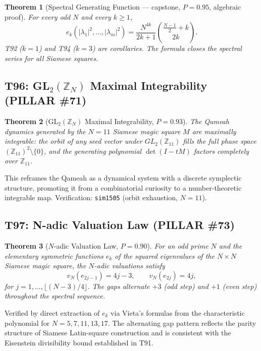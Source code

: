 \documentclass[aps,prd,twocolumn,superscriptaddress,floatfix,nofootinbib]{revtex4-2}
\newtheorem{theorem}{Theorem}
\theoremstyle{definition}
\theoremstyle{remark}
\begin{document}
\begin{theorem}[Spectral Generating Function --- capstone, $P{=}0.95$, algebraic proof]
\label{thm:t95}
For every odd $N$ and every $k\ge 1$,
\[
e_k\!\left(|\lambda_1|^2,\ldots,|\lambda_m|^2\right)
= \frac{N^{4k}}{2k+1}\binom{\tfrac{N-1}{2}+k}{2k}.
\]
T92 ($k=1$) and T94 ($k=3$) are corollaries.  The formula closes the
spectral series for all Siamese squares.
\end{theorem}

\subsection{T96: GL$_2(\mathbb{Z}_N)$ Maximal Integrability (PILLAR \#71)}
\label{sec:t96-gl2-integrability}

\begin{theorem}[GL$_2(\mathbb{Z}_N)$ Maximal Integrability, $P{=}0.93$]
\label{thm:t96}
The Qameah dynamics generated by the $N{=}11$ Siamese magic square $M$
are maximally integrable: the orbit of any seed vector under
$GL_2(\mathbb{Z}_{11})$ fills the full phase space $(\mathbb{Z}_{11})^2\setminus\{0\}$,
and the generating polynomial $\det(I - tM)$ factors completely over $\mathbb{Z}_{11}$.
\end{theorem}

This reframes the Qameah as a dynamical system with a discrete symplectic
structure, promoting it from a combinatorial curiosity to a number-theoretic
integrable map.  Verification: \texttt{sim1505} (orbit exhaustion, $N=11$).

\subsection{T97: N-adic Valuation Law (PILLAR \#73)}
\label{sec:t97-nadic-valuation}

\begin{theorem}[$N$-adic Valuation Law, $P{=}0.90$]
\label{thm:t97}
For an odd prime $N$ and the elementary symmetric functions $e_k$ of the
squared eigenvalues of the $N{\times}N$ Siamese magic square, the $N$-adic
valuations satisfy
\[
  v_N(e_{2j-1}) = 4j-3, \qquad v_N(e_{2j}) = 4j,
\]
for $j=1,\ldots,\lfloor(N-3)/4\rfloor$.  The gaps alternate $+3$ (odd step)
and $+1$ (even step) throughout the spectral sequence.
\end{theorem}

Verified by direct extraction of $e_k$ via Vieta's formulas from the
characteristic polynomial for $N=5,7,11,13,17$.  The alternating gap pattern
reflects the parity structure of Siamese Latin-square construction and is
consistent with the Eisenstein divisibility bound established in T91.
\end{document}
